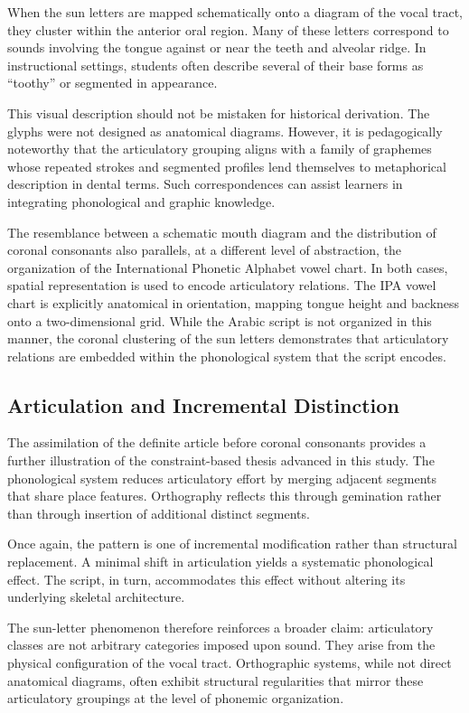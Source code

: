 \documentclass[11pt]{article}
\begin{document}
When the sun letters are mapped schematically onto a diagram of the vocal tract, they cluster within the anterior oral region. Many of these letters correspond to sounds involving the tongue against or near the teeth and alveolar ridge. In instructional settings, students often describe several of their base forms as ``toothy'' or segmented in appearance.

This visual description should not be mistaken for historical derivation. The glyphs were not designed as anatomical diagrams. However, it is pedagogically noteworthy that the articulatory grouping aligns with a family of graphemes whose repeated strokes and segmented profiles lend themselves to metaphorical description in dental terms. Such correspondences can assist learners in integrating phonological and graphic knowledge.

The resemblance between a schematic mouth diagram and the distribution of coronal consonants also parallels, at a different level of abstraction, the organization of the International Phonetic Alphabet vowel chart. In both cases, spatial representation is used to encode articulatory relations. The IPA vowel chart is explicitly anatomical in orientation, mapping tongue height and backness onto a two-dimensional grid. While the Arabic script is not organized in this manner, the coronal clustering of the sun letters demonstrates that articulatory relations are embedded within the phonological system that the script encodes.

\subsection{Articulation and Incremental Distinction}

The assimilation of the definite article before coronal consonants provides a further illustration of the constraint-based thesis advanced in this study. The phonological system reduces articulatory effort by merging adjacent segments that share place features. Orthography reflects this through gemination rather than through insertion of additional distinct segments.

Once again, the pattern is one of incremental modification rather than structural replacement. A minimal shift in articulation yields a systematic phonological effect. The script, in turn, accommodates this effect without altering its underlying skeletal architecture.

The sun-letter phenomenon therefore reinforces a broader claim: articulatory classes are not arbitrary categories imposed upon sound. They arise from the physical configuration of the vocal tract. Orthographic systems, while not direct anatomical diagrams, often exhibit structural regularities that mirror these articulatory groupings at the level of phonemic organization.
\end{document}
